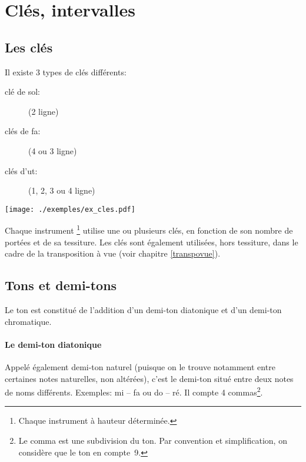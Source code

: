 \documentclass[11pt]{scrreprt}
\begin{document}
\newpage
{}
\fancyfoot[CO]{\thepage}%
\tableofcontents
\cleardoublepage
\clearpage
{}
\fancyfoot[CO]{\thepage}%

\chapter{Clés, intervalles}
\section{Les clés}
Il existe 3 types de clés différents: 
\begin{description}
\item [clé de sol:] (2\ieme{} ligne)
\item [clés de fa:] (4\ieme{} ou 3\ieme{} ligne)
\item  [clés d'ut:] (1\iere, 2\ieme, 3\ieme{} ou 4\ieme{} ligne)
\end{description}
\begin{center}
\texttt{[image: ./exemples/ex\_cles.pdf]}
\end{center}

Chaque instrument \footnote{Chaque instrument à hauteur déterminée.} utilise une ou plusieurs clés, en fonction de son nombre de portées et de sa tessiture.
Les clés sont également utilisées, hors tessiture, dans le cadre de la transposition à vue (voir chapitre \ref{transpovue}).


\section{Tons et demi-tons}
Le ton est constitué de l'addition d'un demi-ton diatonique et d'un demi-ton chromatique.
\subsubsection{Le demi-ton diatonique}
Appelé également demi-ton naturel (puisque on le trouve notamment entre certaines notes naturelles, non altérées), c'est le demi-ton situé entre deux notes de noms différents. Exemples: mi -- fa ou do \sharp{} -- ré. Il compte 4 commas\footnote{Le comma est une subdivision du ton. Par convention et simplification, on considère que le ton en compte~9.}.
\end{document}
